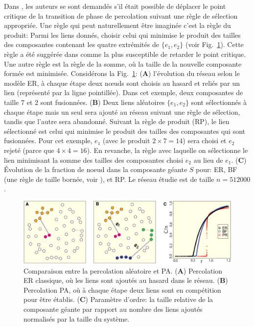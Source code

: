 Dans \cite{Achlioptas-al2009}, les auteurs se sont demandés s'il était possible de déplacer le point critique de la transition de phase de percolation suivant une règle de sélection appropriée. Une règle qui peut naturellement être imaginée c'est la règle du produit: Parmi les liens donnés, choisir celui qui minimise le produit des tailles des composantes contenant les quatre extrémités de $\{e_1,e_2\}$ (voir Fig.~\ref{achlioptas}). Cette règle a été suggérée dans \cite{Bollobas-1984} comme la plus susceptible de retarder le point critique. Une autre règle est la règle de la somme, où la taille de la nouvelle composante formée est minimisée.
Considérons la Fig.~\ref{achlioptas}: (\textbf{A}) l'évolution du réseau  selon le modèle ER, à chaque étape deux nœuds sont choisis au hasard et reliés par un lien (représenté par la ligne pointillée). Dans cet exemple, deux composantes de taille $7$ et $2$ sont fusionnées. (\textbf{B}) Deux liens aléatoires $\{e_1,e_2\}$ sont sélectionnés à chaque étape mais un seul sera ajouté au réseau suivant une règle de sélection, tandis que l'autre sera abandonné.
Suivant la règle de produit (RP), le lien sélectionné est celui qui minimise le produit des tailles des composantes qui sont fusionnées. Pour cet exemple, $e_1$ (avec le produit $2\times7=14$) sera choisi et $e_2$ rejeté (parce que $4\times4=16$). En revanche, la règle avec laquelle on sélectionne le lien minimisant la somme des tailles des composantes choisi $e_2$ au lieu de $e_1$. (\textbf{C}) Évolution de la  fraction de noeud dans la composante géante  $S$ pour: ER, BF (une règle de taille bornée, voir \cite{Bohman-Frieze2001}), et RP. Le réseau étudie est de taille $n=512000$.
\begin{figure}[h!]
	\centering
	\includegraphics[scale=0.35]{./figures/achlioptas3}
	\caption{Comparaison entre la percolation aléatoire et PA. (\textbf{A}) Percolation ER classique, où les liens sont ajoutés au hasard dans le réseau. (\textbf{B}) Percolation PA, où à chaque étape deux liens sont en compétition pour être établis. (\textbf{C}) Paramètre d'ordre: la taille relative de la composante géante par rapport au nombre des liens ajoutés normalisés par la taille du système.}
	\label{achlioptas}
\end{figure}

